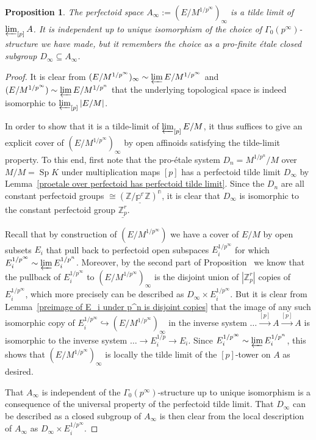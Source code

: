 \documentclass[11pt,oneside]{amsart}
\newtheorem{proposition}[theorem]{Proposition}
\theoremstyle{definition}
\theoremstyle{remark}
\begin{document}
	\begin{proposition}\label{tilde limit of tilde limits of partial towers is tilde limit of whole tower}
		The perfectoid space  $A_\infty:=(E/M^{1/p^\infty})_\infty$ is a tilde limit of $\varprojlim_{[p]}A$.	It is independent up to unique isomorphism of the choice of $\Gamma_0(p^\infty)$-structure we have made, but it remembers the choice as a pro-finite \'etale closed subgroup $D_\infty \subseteq A_\infty$. 
	\end{proposition}
	\begin{proof}
	It is clear from $(E/M^{1/p^\infty})_\infty \sim \varprojlim E/M^{1/p^\infty}$ and $(E/M^{1/p^\infty})\sim \varprojlim E/M^{1/p^n}$ that the underlying topological space is indeed isomorphic to $\varprojlim_{[p]}|E/M|$.

	In order to show that it is a tilde-limit of $\varprojlim_{[p]}E/M$, it thus suffices to give an explicit cover of $(E/M^{1/p^\infty})_\infty$ by open affinoids satisfying the tilde-limit property. To this end,
	first note that the pro-\'etale system $D_n=M^{1/p^n}/M$ over $M/M=\operatorname{Sp}K$ under multiplication maps $[p]$ has a perfectoid tilde limit $D_\infty$ by Lemma~\ref{proetale over perfectoid has perfectoid tilde limit}. Since the $D_n$ are all constant perfectoid groups $\cong \mathbb \underline{(Z/p^r\mathbb Z)^n}$, it is clear that $D_\infty$ is isomorphic to the constant perfectoid group $\underline{\mathbb Z_p^r}$.
	
	Recall that by construction of $(E/M^{1/p^\infty})$ we have a cover of $E/M$ by open subsets $E_i$ that pull back to perfectoid open subspaces $E_i^{1/p^\infty}$ for which $E_i^{1/p^\infty}\sim \varprojlim E_i^{1/p^n}$. Moreover, by the second part of Proposition~\label{horizontal etale map pulls back to vertical limit} we know that the pullback of $E_i^{1/p^\infty}$ to $(E/M^{1/p^\infty})_\infty$ is the disjoint union of $|\mathbb Z_p^r|$ copies of $E_i^{1/p^\infty}$, which more precisely can be described as $D_\infty \times E_i^{1/p^\infty}$. But it is clear from Lemma~\ref{preimage of E_i under p^n is disjoint copies} that the image of any such isomorphic copy of $E_i^{1/p^\infty}\hookrightarrow   (E/M^{1/p^\infty})_\infty$ in the inverse system $\dots\xrightarrow{[p]}A\xrightarrow{[p]} A$ is isomorphic to the inverse system $\dots\rightarrow E_i^{1/p}\rightarrow E_i$. Since $E_i^{1/p^\infty}\sim \varprojlim E_i^{1/p^n}$, this shows that $(E/M^{1/p^\infty})_\infty$ is locally the tilde limit of the $[p]$-tower on $A$ as desired.
	
	That $A_\infty$ is independent of the $\Gamma_0(p^\infty)$-structure up to unique isomorphism is a consequence of the universal property of the perfectoid tilde limit. That $D_\infty$ can be described as a closed subgroup of $A_\infty$ is then clear from the local description of $A_\infty$ as $D_\infty \times E_i^{1/p^\infty}$.
	\end{proof}
\end{document}
